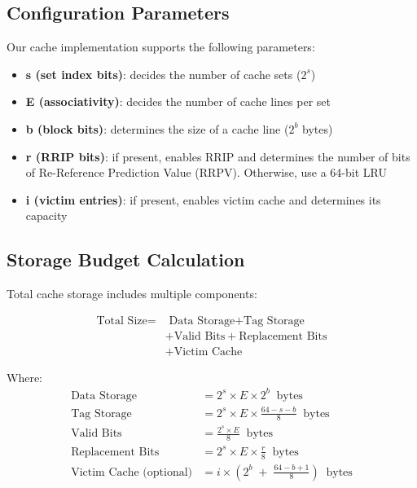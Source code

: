 \documentclass[sigconf,nonacm,natbib=false]{acmart}
\begin{document}
\subsection{Configuration Parameters}

Our cache implementation supports the following parameters:
\begin{itemize}
    \item \textbf{s (set index bits)}: decides the number of cache sets ($2^s$)
    \item \textbf{E (associativity)}: decides the number of cache lines per set
    \item \textbf{b (block bits)}: determines the size of a cache line ($2^b$ bytes)
    \item \textbf{r (RRIP bits)}: if present, enables RRIP and determines the number of bits of Re-Reference Prediction Value (RRPV). Otherwise, use a 64-bit LRU
    \item \textbf{i (victim entries)}: if present, enables victim cache and determines its capacity
\end{itemize}

\subsection{Storage Budget Calculation}

Total cache storage includes multiple components:

\begin{equation}
    \begin{split}
        \text{Total Size} = & \text{ Data Storage} + \text{Tag Storage} \\
                            & + \text{Valid Bits} + \text{Replacement Bits} \\
                            & + \text{Victim Cache}
    \end{split}
\end{equation}

Where:
\begin{align}
\text{Data Storage} &= 2^s \times E \times 2^b \;\; \text{bytes} \\
\text{Tag Storage} &= 2^s \times E \times \frac{64 - s - b}{8} \;\; \text{bytes} \\
\text{Valid Bits} &= \frac{2^s \times E}{8} \;\; \text{bytes} \\
\text{Replacement Bits} &= 2^s \times E \times \frac{r}{8} \;\; \text{bytes} \\
\text{Victim Cache (optional)} &= i \times \left(2^b \;+\; \frac{64 - b + 1}{8}\right) \;\; \text{bytes}
\end{align}
\end{document}
